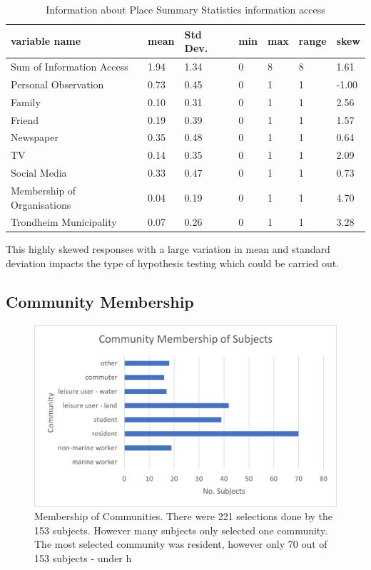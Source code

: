 \begin{center}
\begin{table}[h!]
    \centering
    \begin{tabular}{|l|l|l|l|l|l|l|}
    \hline
        variable name & mean & Std Dev. & min & max & range & skew  \\ \hline
        Sum of Information Access & 1.94 & 1.34 & 0 & 8 & 8 & 1.61 \\ \hline
        Personal Observation & 0.73 & 0.45 & 0 & 1 & 1 & -1.00  \\ \hline
        Family & 0.10 & 0.31 & 0 & 1 & 1 & 2.56 \\ \hline
        Friend & 0.19 & 0.39 & 0 & 1 & 1 & 1.57  \\ \hline
        Newspaper & 0.35 & 0.48 & 0 & 1 & 1 & 0.64  \\ \hline
        TV & 0.14 & 0.35 & 0 & 1 & 1 & 2.09 \\ \hline
       Social Media & 0.33 & 0.47 & 0 & 1 & 1 & 0.73  \\ \hline
        Membership of Organisations & 0.04 & 0.19 & 0 & 1 & 1 & 4.70 \\ \hline
        Trondheim Municipality & 0.07 & 0.26 & 0 & 1 & 1 & 3.28\\ \hline
                
         \end{tabular}
    \caption{Information about Place Summary Statistics information access}
\label{table:summary_stats_info_access}
\end{table}
\end{center}

This highly skewed responses with a large variation in mean and standard deviation impacts the type of hypothesis testing which could be carried out. 

\subsection{Community Membership}

\begin{figure}[h!]
    \centering
    \includegraphics{fig_results/com-mem-horizontal.png}
    \caption{Membership of Communities. There were 221 selections done by the 153 subjects. However many subjects only selected one community. The most selected community was resident, however only 70 out of 153 subjects - under h}
    \label{fig:my_label}
\end{figure}
